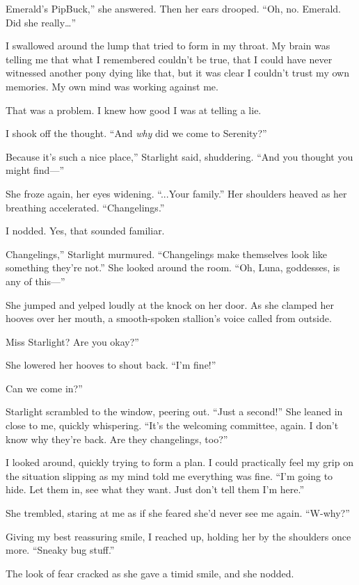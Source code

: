 \leavevmode{}Emerald’s PipBuck,” she answered. Then her ears drooped. “Oh, no. Emerald. Did she really…”

I swallowed around the lump that tried to form in my throat. My brain was telling me that what I remembered couldn’t be true, that I could have never witnessed another pony dying like that, but it was clear I couldn’t trust my own memories. My own mind was working against me.

That was a problem. I knew how good I was at telling a lie.

I shook off the thought. “And \textit{why} did we come to Serenity?”

\leavevmode{}Because it’s such a nice place,” Starlight said, shuddering. “And you thought you might find—”

She froze again, her eyes widening. “...Your family.” Her shoulders heaved as her breathing accelerated. “Changelings.”

I nodded. Yes, that sounded familiar.

\leavevmode{}Changelings,” Starlight murmured. “Changelings make themselves look like something they’re not.” She looked around the room. “Oh, Luna, goddesses, is any of this—”

She jumped and yelped loudly at the knock on her door. As she clamped her hooves over her mouth, a smooth-spoken stallion’s voice called from outside.

\leavevmode{}Miss Starlight? Are you okay?”

She lowered her hooves to shout back. “I’m fine!”

\leavevmode{}Can we come in?”

Starlight scrambled to the window, peering out. “Just a second!” She leaned in close to me, quickly whispering. “It’s the welcoming committee, again. I don’t know why they’re back. Are they changelings, too?”

I looked around, quickly trying to form a plan. I could practically feel my grip on the situation slipping as my mind told me everything was fine. “I’m going to hide. Let them in, see what they want. Just don’t tell them I’m here.”

She trembled, staring at me as if she feared she’d never see me again. “W-why?”

Giving my best reassuring smile, I reached up, holding her by the shoulders once more. “Sneaky bug stuff.”

The look of fear cracked as she gave a timid smile, and she nodded.


